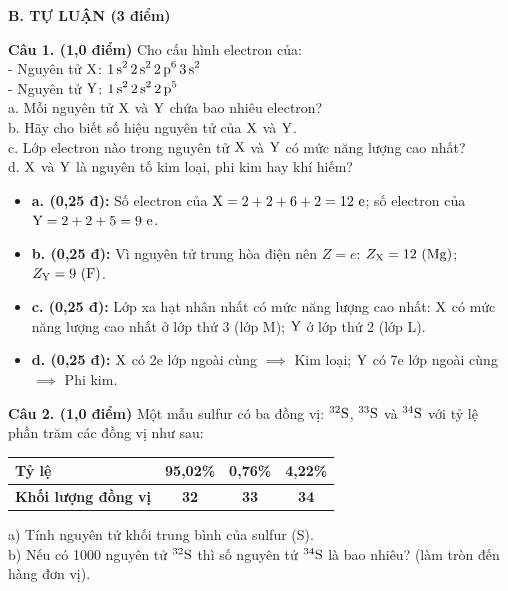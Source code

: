 \documentclass[11pt,a4paper]{article}
\begin{document}
\vspace{6pt}
\noindent
{\color{mainGreen}\textbf{\Large B. TỰ LUẬN (3 điểm)}}
\vspace{2pt}

\noindent
\textbf{Câu 1. (1,0 điểm)} Cho cấu hình electron của:\\
- Nguyên tử $\ce{X}$: $\ce{1s^2 2s^2 2p^6 3s^2}$\\
- Nguyên tử $\ce{Y}$: $\ce{1s^2 2s^2 2p^5}$\\
a. Mỗi nguyên tử $\ce{X}$ và $\ce{Y}$ chứa bao nhiêu electron?\\
b. Hãy cho biết số hiệu nguyên tử của $\ce{X}$ và $\ce{Y}$.\\
c. Lớp electron nào trong nguyên tử $\ce{X}$ và $\ce{Y}$ có mức năng lượng cao nhất?\\
d. $\ce{X}$ và $\ce{Y}$ là nguyên tố kim loại, phi kim hay khí hiếm?

\begin{tcolorbox}[colback=white,colframe=solBlue,title=\textbf{Lời giải chi tiết và Biểu điểm Câu 1:}]
\begin{itemize}[leftmargin=1.2cm]
\item \textbf{a. (0,25 đ):} Số electron của $\ce{X} = 2 + 2 + 6 + 2 = 12\text{ e}$; số electron của $\ce{Y} = 2 + 2 + 5 = 9\text{ e}$.
\item \textbf{b. (0,25 đ):} Vì nguyên tử trung hòa điện nên $Z = e$: $Z_{\ce{X}} = 12\ (\ce{Mg})$; $Z_{\ce{Y}} = 9\ (\ce{F})$.
\item \textbf{c. (0,25 đ):} Lớp xa hạt nhân nhất có mức năng lượng cao nhất: $\ce{X}$ có mức năng lượng cao nhất ở lớp thứ 3 (lớp M); $\ce{Y}$ ở lớp thứ 2 (lớp L).
\item \textbf{d. (0,25 đ):} $\ce{X}$ có 2e lớp ngoài cùng $\implies$ Kim loại; $\ce{Y}$ có 7e lớp ngoài cùng $\implies$ Phi kim.
\end{itemize}
\end{tcolorbox}

\vspace{4pt}
\noindent
\textbf{Câu 2. (1,0 điểm)} Một mẫu sulfur có ba đồng vị: $^{32}\ce{S}$, $^{33}\ce{S}$ và $^{34}\ce{S}$ với tỷ lệ phần trăm các đồng vị như sau:
\begin{center}
\renewcommand{\arraystretch}{1.2}
\begin{tabular}{|l|c|c|c|}
\hline
\rowcolor{tableGreen}
\textbf{Tỷ lệ} & \textbf{95,02\%} & \textbf{0,76\%} & \textbf{4,22\%} \\
\hline
\textbf{Khối lượng đồng vị} & \textbf{32} & \textbf{33} & \textbf{34} \\
\hline
\end{tabular}
\end{center}
a) Tính nguyên tử khối trung bình của sulfur (S).\\
b) Nếu có 1000 nguyên tử $^{32}\ce{S}$ thì số nguyên tử $^{34}\ce{S}$ là bao nhiêu? (làm tròn đến hàng đơn vị).
\end{document}
